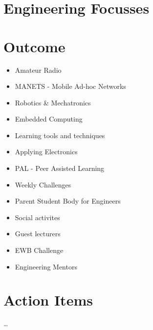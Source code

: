 \section{Engineering Focusses}
\label{sec:focii}

\section{Outcome}
\begin{itemize}
  \item Amateur Radio
  \item MANETS - Mobile Ad-hoc Networks
  \item Robotics \& Mechatronics
  \item Embedded Computing
  \item Learning tools and techniques
  \item Applying Electronics
  \item PAL - Peer Assisted Learning
  \item Weekly Challenges
  \item Parent Student Body for Engineers
  \item Social activites
  \item Guest lecturers
  \item EWB Challenge
  \item Engineering Mentors
\end{itemize}

\section{Action Items}
\ldots